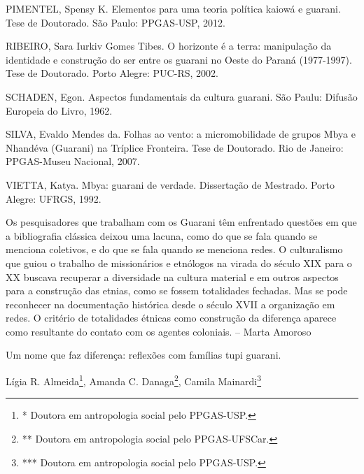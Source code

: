 \documentclass{article}
\begin{document}
PIMENTEL, Spensy K. Elementos para uma teoria pol\'itica kaiow\'a e
guarani.  Tese de Doutorado. S\~ao Paulo: PPGAS-USP, 2012.

RIBEIRO, Sara Iurkiv Gomes Tibes. O horizonte \'e a terra:
manipula\c{c}\~ao da identidade e constru\c{c}\~ao do ser entre os
guarani no Oeste do Paran\'a (1977-1997). Tese de Doutorado. Porto
Alegre: PUC-RS, 2002.

SCHADEN, Egon. Aspectos fundamentais da cultura guarani. S\~ao Paulu:
Difus\~ao Europeia do Livro, 1962.

SILVA, Evaldo Mendes da. Folhas ao vento: a micromobilidade de grupos
Mbya e Nhand\'eva (Guarani) na Tr\'iplice Fronteira. Tese de Doutorado.
Rio de Janeiro: PPGAS-Museu Nacional, 2007.

VIETTA, Katya. Mbya: guarani de verdade. Disserta\c{c}\~ao de Mestrado.
Porto Alegre: UFRGS, 1992.

Os pesquisadores que trabalham com os Guarani t\^em enfrentado
quest\~oes em que a bibliografia cl\'assica deixou uma lacuna, como do
que se fala quando se menciona coletivos, e do que se fala quando se
menciona redes. O culturalismo que guiou o trabalho de mission\'arios e
etn\'ologos na virada do s\'eculo XIX para o XX buscava recuperar a
diversidade na cultura material e em outros aspectos para a
constru\c{c}\~ao das etnias, como se fossem totalidades fechadas. Mas
se pode reconhecer na documenta\c{c}\~ao hist\'orica desde o s\'eculo
XVII a organiza\c{c}\~ao em redes. O crit\'erio de totalidades
\'etnicas como constru\c{c}\~ao da diferen\c{c}a aparece como
resultante do contato com os agentes coloniais. -- Marta Amoroso

Um nome que faz diferen\c{c}a: reflex\~oes com fam\'ilias tupi guarani.

L\'igia R. Almeida\footnote{* Doutora em antropologia social pelo
PPGAS-USP.}, Amanda C. Danaga\footnote{** Doutora em antropologia
social pelo PPGAS-UFSCar.}, Camila Mainardi\footnote{*** Doutora em
antropologia social pelo PPGAS-USP.}
\end{document}
